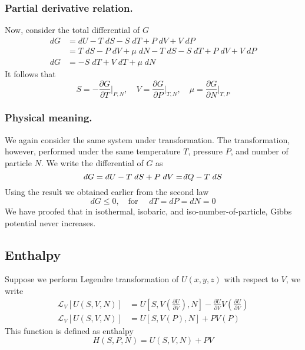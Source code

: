 \documentclass[../../../Main.tex]{subfiles}
\begin{document}
\subsubsection*{Partial derivative relation.} Now, consider the total differential of $G$
\begin{align*}
    dG&=dU-T\;dS-S\;dT+P\;dV+V\;dP\\
    &=T\;dS-P\;dV+\mu \;dN-T\;dS-S\;dT+P\;dV+V\;dP\\
    dG&=-S\;dT+V\;dT+\mu\;dN
\end{align*}
It follows that 
\begin{equation*}
    S=-\frac{\partial G}{\partial T}\bigg|_{P,N},\quad V=\frac{\partial G}{\partial P}\bigg|_{T,N},\quad \mu=\frac{\partial G}{\partial N}\bigg|_{T,P}
\end{equation*}

\subsubsection*{Physical meaning.} We again consider the same system under transformation. The transformation, however, performed under the same temperature $T$, pressure $P$, and number of particle $N$. We write the differential of $G$ as 
\begin{equation*}
    dG=dU-T\;dS+P\;dV=\dbar Q-T\;dS
\end{equation*}
Using the result we obtained earlier from the second law
\begin{equation*}
    dG \leq0, \quad \text{for }\quad dT=dP=dN=0
\end{equation*}
We have proofed that in isothermal, isobaric, and iso-number-of-particle, Gibbs potential never increases.
\subsection*{Enthalpy}
Suppose we perform Legendre transformation of $U(x,y,z)$ with respect to $V$, we write 
\begin{align*}
    \mathcal{L}_V\left[U(S,V,N)\right]&= U\left[S,V\left(\frac{\partial U}{\partial V}\right),N\right]- \frac{\partial U}{\partial V}V\left(\frac{\partial U}{\partial V}\right) \\
    \mathcal{L}_V\left[U(S,V,N)\right]&=U\left[S,V(P),N\right]+PV(P)
\end{align*}
This function is defined as enthalpy
\begin{equation*}
    H(S,P,N)=U(S,V,N)+PV
\end{equation*}
\end{document}
